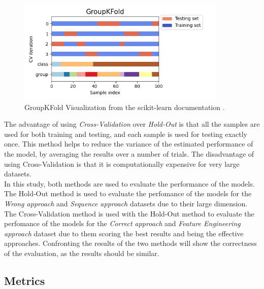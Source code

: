 \begin{itemize}
                    \begin{figure}[H]
                        \centering
                        \includegraphics[width=\textwidth,height=5cm,keepaspectratio=true]{../src/resources/groupkfold.png}
                        \caption{
                          GroupKFold Visualization from the scikit-learn documentation \cite{scikit-learn}.
                        }
                        \label{fig:groupkfold}
                    \end{figure}
                \end{itemize}
                
        The advantage of using \textit{Cross-Validation} over \textit{Hold-Out} is that all the samples are used for both training and testing, and each sample is used for testing exactly once. This method helps to reduce the variance of the estimated performance of the model, by averaging the results over a number of trials. The disadvantage of using Cross-Validation is that it is computationally expensive for very large datasets. \\ 

        In this study, both methods are used to evaluate the performance of the models. The Hold-Out method is used to evaluate the perfomance of the models for the \textit{Wrong approach} and \textit{Sequence approach} datasets due to their large dimension. The Cross-Validation method is used  with the Hold-Out method to evaluate the perfomance of the models for the \textit{Correct approach} and \textit{Feature Engineering approach} dataset due to them scoring the best results and being the effective approaches. Confronting the results of the two methods will show the correctness of the evaluation, as the results should be similar. \\
        
        \subsection{Metrics}

